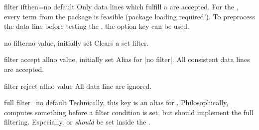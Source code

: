 \documentclass[a4paper,11pt]{ltxdoc}
\begin{document}
\clearpage
\begin{docCsvKey}[][doc new=2016-07-01]{filter ifthen}{=}{no default}
  Only data lines which fulfill a  are accepted.
  For the , every term from the  package
  is feasible (package loading required!).
  To preprocess the data line before testing the ,
  the option key  can be used.

\begin{dispExample}
\end{dispExample}
\end{docCsvKey}


\begin{docCsvKey}{no filter}{}{no value, initially set}
  Clears a set filter.
\end{docCsvKey}


\begin{docCsvKey}{filter accept all}{}{no value, initially set}
  Alias for |no filter|. All consistent data lines are accepted.
\end{docCsvKey}


\begin{docCsvKey}{filter reject all}{}{no value}
  All data line are ignored.
\end{docCsvKey}


\begin{docCsvKey}[][doc new=2016-07-01]{full filter}{=}{no default}
  Technically, this key is an alias for .
  Philosophically,  computes something before
  a filter condition is set, but  should implement
  the full filtering. Especially,  or
   \emph{should} be set inside the .
\begin{dispExample}
\end{dispExample}
\end{docCsvKey}
\end{document}
